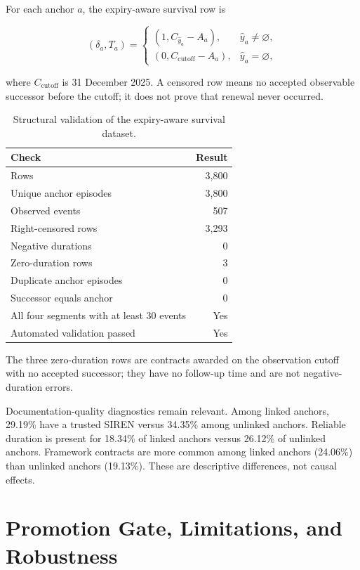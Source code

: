 \documentclass[11pt,a4paper]{article}
\begin{document}
For each anchor $a$, the expiry-aware survival row is

\begin{equation}
(\delta_a,T_a)=
\begin{cases}
\left(1,C_{\widehat{y}_a}-A_a\right), & \widehat{y}_a\ne\varnothing,\\
\left(0,C_{\mathrm{cutoff}}-A_a\right), & \widehat{y}_a=\varnothing,
\end{cases}
\end{equation}

where $C_{\mathrm{cutoff}}$ is 31 December 2025. A censored row means no accepted
observable successor before the cutoff; it does not prove that renewal never
occurred.

\begin{table}[H]
\centering
\caption{Structural validation of the expiry-aware survival dataset.}
\label{tab:validation}
\begin{tabular}{lr}
\toprule
\textbf{Check} & \textbf{Result} \\
\midrule
Rows & 3,800 \\
Unique anchor episodes & 3,800 \\
Observed events & 507 \\
Right-censored rows & 3,293 \\
Negative durations & 0 \\
Zero-duration rows & 3 \\
Duplicate anchor episodes & 0 \\
Successor equals anchor & 0 \\
All four segments with at least 30 events & Yes \\
Automated validation passed & Yes \\
\bottomrule
\end{tabular}
\end{table}

The three zero-duration rows are contracts awarded on the observation cutoff with no
accepted successor; they have no follow-up time and are not negative-duration errors.

Documentation-quality diagnostics remain relevant. Among linked anchors, 29.19\%
have a trusted SIREN versus 34.35\% among unlinked anchors. Reliable duration is
present for 18.34\% of linked anchors versus 26.12\% of unlinked anchors. Framework
contracts are more common among linked anchors (24.06\%) than unlinked anchors
(19.13\%). These are descriptive differences, not causal effects.

\section{Promotion Gate, Limitations, and Robustness}
\end{document}
